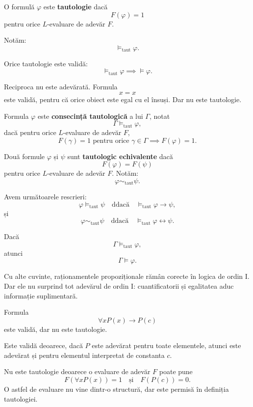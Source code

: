 \begin{definition}
	O formulă \( \varphi \) este \textbf{tautologie} dacă
	\[
		F(\varphi)=1
	\]
	pentru orice \(L\)-evaluare de adevăr \(F\).

	Notăm:
	\[
		\models_{\mathrm{taut}} \varphi.
	\]
\end{definition}

\begin{prop}
	Orice tautologie este validă:
	\[
		\models_{\mathrm{taut}} \varphi
		\implies
		\models \varphi.
	\]
\end{prop}

\begin{note}
	Reciproca nu este adevărată. Formula
	\[
		x=x
	\]
	este validă, pentru că orice obiect este egal cu el însuși. Dar nu este tautologie.
\end{note}

\begin{definition}
	Formula \( \varphi \) este \textbf{consecință tautologică} a lui \( \Gamma \), notat
	\[
		\Gamma \models_{\mathrm{taut}} \varphi,
	\]
	dacă pentru orice \(L\)-evaluare de adevăr \(F\),
	\[
		F(\gamma)=1 \text{ pentru orice } \gamma \in \Gamma
		\implies
		F(\varphi)=1.
	\]
\end{definition}

\begin{definition}
	Două formule \( \varphi \) și \( \psi \) sunt \textbf{tautologic echivalente} dacă
	\[
		F(\varphi)=F(\psi)
	\]
	pentru orice \(L\)-evaluare de adevăr \(F\). Notăm:
	\[
		\varphi \sim_{\mathrm{taut}} \psi.
	\]
\end{definition}

\begin{prop}
	Avem următoarele rescrieri:
	\[
		\varphi \models_{\mathrm{taut}} \psi
		\quad \text{ddacă} \quad
		\models_{\mathrm{taut}} \varphi \to \psi,
	\]
	și
	\[
		\varphi \sim_{\mathrm{taut}} \psi
		\quad \text{ddacă} \quad
		\models_{\mathrm{taut}} \varphi \leftrightarrow \psi.
	\]
\end{prop}

\begin{prop}
	Dacă
	\[
		\Gamma \models_{\mathrm{taut}} \varphi,
	\]
	atunci
	\[
		\Gamma \models \varphi.
	\]
\end{prop}

Cu alte cuvinte, raționamentele propoziționale rămân corecte în logica de ordin I. Dar ele nu surprind tot adevărul de ordin I: cuantificatorii și egalitatea aduc informație suplimentară.

\begin{eg}
	Formula
	\[
		\forall x P(x) \to P(c)
	\]
	este validă, dar nu este tautologie.

	Este validă deoarece, dacă \(P\) este adevărat pentru toate elementele, atunci este adevărat și pentru elementul interpretat de constanta \(c\).

	Nu este tautologie deoarece o evaluare de adevăr \(F\) poate pune
	\[
		F(\forall x P(x))=1
		\quad \text{și} \quad
		F(P(c))=0.
	\]
	O astfel de evaluare nu vine dintr-o structură, dar este permisă în definiția tautologiei.
\end{eg}

